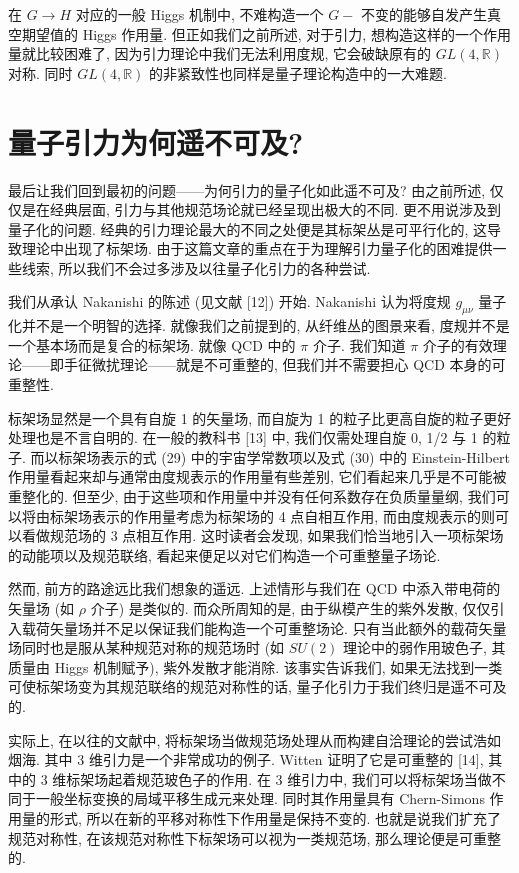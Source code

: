 \documentclass{article}
\begin{document}
在 $G\rightarrow H$ 对应的一般 Higgs 机制中, 不难构造一个 $G-$ 不变的能够自发产生真空期望值的 Higgs 作用量. 但正如我们之前所述, 对于引力, 想构造这样的一个作用量就比较困难了, 因为引力理论中我们无法利用度规, 它会破缺原有的  $GL(4, \mathbb{R})$ 对称. 同时  $GL(4, \mathbb{R})$ 的非紧致性也同样是量子理论构造中的一大难题.
\section{量子引力为何遥不可及?}
最后让我们回到最初的问题——为何引力的量子化如此遥不可及? 由之前所述, 仅仅是在经典层面, 引力与其他规范场论就已经呈现出极大的不同. 更不用说涉及到量子化的问题. 经典的引力理论最大的不同之处便是其标架丛是可平行化的, 这导致理论中出现了标架场. 由于这篇文章的重点在于为理解引力量子化的困难提供一些线索, 所以我们不会过多涉及以往量子化引力的各种尝试.

我们从承认 Nakanishi 的陈述 (见文献 [12]) 开始. Nakanishi 认为将度规 $g_{\mu\nu}$ 量子化并不是一个明智的选择. 就像我们之前提到的, 从纤维丛的图景来看, 度规并不是一个基本场而是复合的标架场. 就像 QCD 中的 $\pi$ 介子. 我们知道 $\pi$ 介子的有效理论——即手征微扰理论——就是不可重整的, 但我们并不需要担心 QCD 本身的可重整性.

标架场显然是一个具有自旋 1 的矢量场, 而自旋为 1 的粒子比更高自旋的粒子更好处理也是不言自明的. 在一般的教科书 [13] 中, 我们仅需处理自旋 0, 1/2 与 1 的粒子. 而以标架场表示的式 (29) 中的宇宙学常数项以及式 (30) 中的 Einstein-Hilbert 作用量看起来却与通常由度规表示的作用量有些差别, 它们看起来几乎是不可能被重整化的. 但至少, 由于这些项和作用量中并没有任何系数存在负质量量纲, 我们可以将由标架场表示的作用量考虑为标架场的 4 点自相互作用, 而由度规表示的则可以看做规范场的 3 点相互作用. 这时读者会发现, 如果我们恰当地引入一项标架场的动能项以及规范联络, 看起来便足以对它们构造一个可重整量子场论.

然而, 前方的路途远比我们想象的遥远. 上述情形与我们在 QCD 中添入带电荷的矢量场 (如 $\rho$ 介子) 是类似的. 而众所周知的是, 由于纵模产生的紫外发散, 仅仅引入载荷矢量场并不足以保证我们能构造一个可重整场论. 只有当此额外的载荷矢量场同时也是服从某种规范对称的规范场时 (如 $SU(2)$ 理论中的弱作用玻色子, 其质量由 Higgs 机制赋予), 紫外发散才能消除. 该事实告诉我们, 如果无法找到一类可使标架场变为其规范联络的规范对称性的话, 量子化引力于我们终归是遥不可及的.

实际上, 在以往的文献中, 将标架场当做规范场处理从而构建自洽理论的尝试浩如烟海. 其中 3 维引力是一个非常成功的例子. Witten 证明了它是可重整的 [14], 其中的 3 维标架场起着规范玻色子的作用. 在 3 维引力中, 我们可以将标架场当做不同于一般坐标变换的局域平移生成元来处理. 同时其作用量具有 Chern-Simons 作用量的形式, 所以在新的平移对称性下作用量是保持不变的. 也就是说我们扩充了规范对称性, 在该规范对称性下标架场可以视为一类规范场, 那么理论便是可重整的.
\end{document}
